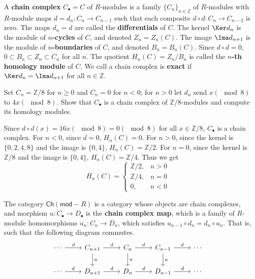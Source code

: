 \begin{defn} A \textbf{chain complex} $C_\bullet=C$ of $R$-modules is a family $\{C_n\}_{n\in \mathbb{Z}}$ of $R$-modules with $R$-module maps $d=d_n:C_n\rightarrow C_{n-1}$ such that each composite $d\circ d:C_n\rightarrow C_{n-2}$ is zero. The maps $d_n=d$ are called the \textbf{differentials} of $C$. The kernel $\Ker d_n$ is the module of \textbf{$n$-cycles} of $C$, and denoted $Z_n=Z_n(C)$. The image $\Ima d_{n+1}$ is the module of \textbf{$n$-boundaries} of $C$, and denoted $B_n=B_n(C)$. Since $d\circ d=0$, $0\subset B_n\subset Z_n\subset C_n$ for all $n$. The quotient $H_n(C)=Z_n/B_n$ is called the \textbf{$n$-th homology module} of $C$. We call a chain complex is \textbf{exact} if $\Ker d_n=\Ima d_{n+1}$ for all $n\in \mathbb{Z}$.
\end{defn}

\begin{exer} Set $C_n=\mathbb{Z}/8$ for $n\geq 0$ and $C_n=0$ for $n<0$; for $n>0$ let $d_n$ send $x(\mod 8)$ to $4x(\mod 8)$. Show that $C_\bullet$ is a chain complex of $\mathbb{Z}/8$-modules and compute its homology modules.
\end{exer}
\begin{solution} Since $d\circ d(x)=16x(\mod 8)=0(\mod 8)$ for all $x\in\mathbb{Z}/8$, $C_\bullet$ is a chain complex. For $n<0$, since $d=0$, $H_n(C)=0$. For $n>0$, since the kernel is $\{0,2,4,8\}$ and the image is $\{0,4\}$, $H_n(C)=\mathbb{Z}/2$. For $n=0$, since the kernel is $\mathbb{Z}/8$ and the image is $\{0,4\}$, $H_n(C)=\mathbb{Z}/4$. Thus we get
\begin{equation}
H_n(C)=\begin{cases}\mathbb{Z}/2,&n>0\\
\mathbb{Z}/4,&n=0\\
0,&n<0
\end{cases}
\end{equation}
\end{solution}

\begin{defn} The category $\mathsf{Ch}(\mathsf{mod}-R)$ is a category whose objects are chain complexes, and morphism $u:C_\bullet\rightarrow D_\bullet$ is the \textbf{chain complex map}, which is a family of $R$-module homomorphisms $u_n:C_n\rightarrow D_n$, which satisfies $u_{n-1}\circ d_n=d_n\circ u_n$. That is, such that the following diagram commutes.
\begin{equation}
\begin{tikzcd}
\cdots\arrow[r,"d"] & C_{n+1}\arrow[r,"d"]\arrow[d,"u"] & C_{n}\arrow[r,"d"]\arrow[d,"u"] & C_{n-1}\arrow[r,"d"]\arrow[d,"u"] & \cdots\\
\cdots\arrow[r,"d"] & D_{n+1}\arrow[r,"d"] & D_{n}\arrow[r,"d"] & D_{n-1}\arrow[r,"d"] & \cdots
\end{tikzcd}
\end{equation}
\end{defn}

